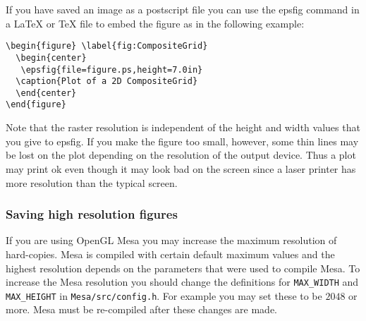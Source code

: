 \documentclass{article}
\begin{document}


\vspace{0.1\baselineskip}
If you have saved an image as a postscript file you can use the {\ff
epsfig} command in a LaTeX or TeX file to embed the figure as in the
following example:
\begin{verbatim}
\begin{figure} \label{fig:CompositeGrid}
  \begin{center}
   \epsfig{file=figure.ps,height=7.0in}
  \caption{Plot of a 2D CompositeGrid}
  \end{center}
\end{figure}
\end{verbatim}


Note that the raster resolution is independent of
the height and width values that you give to {\ff epsfig}. If you make the figure too
small, however, some thin lines may be lost on the plot depending
on the resolution of the output device. Thus a plot may print ok
even though it may look bad on the screen since a laser printer 
has more resolution than the typical screen.

\subsubsection{Saving high resolution figures}

If you are using OpenGL Mesa you may increase the maximum resolution
of hard-copies. Mesa is compiled with certain default maximum values
and the highest resolution depends on the parameters
that were used to compile Mesa. To increase the Mesa resolution you should
change the definitions for {\tt MAX\_WIDTH} and {\tt MAX\_HEIGHT} 
in {\tt Mesa/src/config.h}. For example you may set these to be $2048$ or more.
Mesa must be re-compiled after these changes are made.
\end{document}
